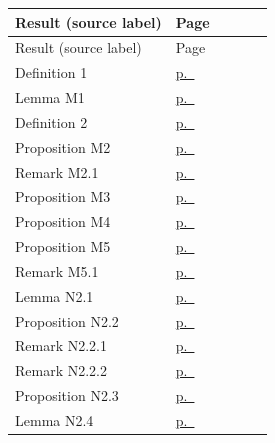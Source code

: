 \begin{center}\footnotesize
\begin{longtable}{@{}L{0.62\linewidth}l@{}}
\toprule Result (source label) & Page \\ \midrule\endfirsthead
\toprule Result (source label) & Page \\ \midrule\endhead
Definition 1 & \hyperref[pD-res-definition-1]{p.~\pageref{pD-res-definition-1}} \\
Lemma M1 & \hyperref[pD-res-lemma-M1]{p.~\pageref{pD-res-lemma-M1}} \\
Definition 2 & \hyperref[pD-res-definition-2]{p.~\pageref{pD-res-definition-2}} \\
Proposition M2 & \hyperref[pD-res-proposition-M2]{p.~\pageref{pD-res-proposition-M2}} \\
Remark M2.1 & \hyperref[pD-res-remark-M2.1]{p.~\pageref{pD-res-remark-M2.1}} \\
Proposition M3 & \hyperref[pD-res-proposition-M3]{p.~\pageref{pD-res-proposition-M3}} \\
Proposition M4 & \hyperref[pD-res-proposition-M4]{p.~\pageref{pD-res-proposition-M4}} \\
Proposition M5 & \hyperref[pD-res-proposition-M5]{p.~\pageref{pD-res-proposition-M5}} \\
Remark M5.1 & \hyperref[pD-res-remark-M5.1]{p.~\pageref{pD-res-remark-M5.1}} \\
Lemma N2.1 & \hyperref[pD-res-lemma-N2.1]{p.~\pageref{pD-res-lemma-N2.1}} \\
Proposition N2.2 & \hyperref[pD-res-proposition-N2.2]{p.~\pageref{pD-res-proposition-N2.2}} \\
Remark N2.2.1 & \hyperref[pD-res-remark-N2.2.1]{p.~\pageref{pD-res-remark-N2.2.1}} \\
Remark N2.2.2 & \hyperref[pD-res-remark-N2.2.2]{p.~\pageref{pD-res-remark-N2.2.2}} \\
Proposition N2.3 & \hyperref[pD-res-proposition-N2.3]{p.~\pageref{pD-res-proposition-N2.3}} \\
Lemma N2.4 & \hyperref[pD-res-lemma-N2.4]{p.~\pageref{pD-res-lemma-N2.4}} \\
\bottomrule
\end{longtable}
\end{center}
